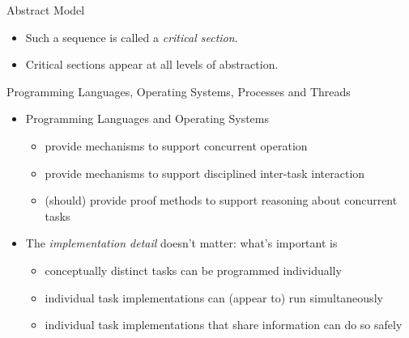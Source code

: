 \documentclass{concdistfoils}
\begin{document}
\begin{section}{Abstract Model}
\begin{slide}
\begin{itemize}
\begin{smaller}
\begin{itemize}
\item Such a sequence is called a \textit{critical section}.
\item Critical sections appear at all levels of abstraction.
\end{itemize}
\end{smaller}
\end{itemize}
\end{slide}
\end{section}

\begin{section}{Programming Languages, Operating Systems, Processes and Threads}
\begin{slide}
\begin{itemize}
\item Programming Languages and Operating Systems 
\begin{itemize}
\item provide mechanisms to support concurrent operation
\item provide mechanisms to support disciplined inter-task interaction
\item (should) provide proof methods to support reasoning about concurrent tasks
\end{itemize}
\vfill
\item The \textit{implementation detail} doesn't matter: what's important is 
\begin{itemize}
\item conceptually distinct tasks can be programmed individually
\item individual task implementations can (appear to) run simultaneously
\item individual task implementations that share information can do so safely
\end{itemize}
\end{itemize}
\end{slide}


\end{section}
\end{document}
